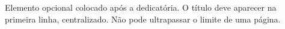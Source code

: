 \begin{agradecimentos}
Elemento opcional colocado após a dedicatória. O título deve aparecer na primeira linha, centralizado. Não pode ultrapassar o limite de uma página.
\end{agradecimentos}